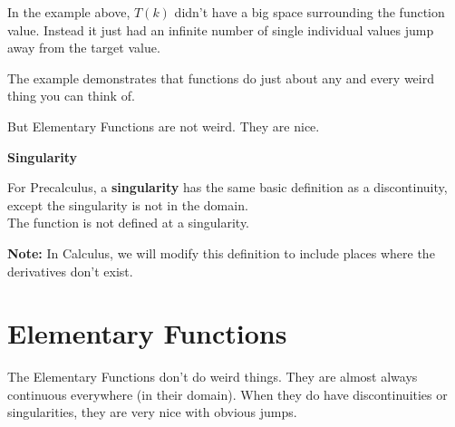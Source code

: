 \documentclass{ximera}
\begin{document}
In the example above, $T(k)$ didn't have a big space surrounding the function value.  Instead it just had an infinite number of single individual values jump away from the target value.


The example demonstrates that functions do just about any and every weird thing you can think of.

But Elementary Functions are not weird.  They are nice.  





\begin{definition} \textbf{\textcolor{green!50!black}{Singularity}}

For Precalculus, a \textbf{singularity} has the same basic definition as a discontinuity, except the singularity is not in the domain. \\


The function is not defined at a singularity.

\end{definition}

\textbf{Note:} In Calculus, we will modify this definition to include places where the derivatives don't exist. 










\section{Elementary Functions}




The Elementary Functions don't do weird things.  They are almost always continuous everywhere (in their domain).  When they do have discontinuities or singularities, they are very nice with obvious jumps.
\end{document}
